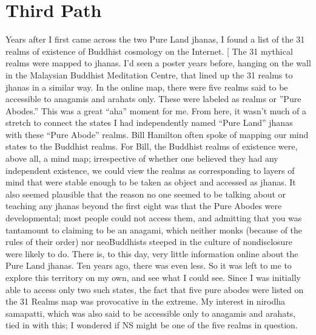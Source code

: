 \documentclass[a5paper,10pt,english]{book}
\begin{document}
\section{Third Path}
\label{\detokenize{main-1:third-path}}
\sphinxAtStartPar
Years after I first came across the two Pure Land jhanas, I found a list
of the 31 realms of existence of Buddhist cosmology on the Internet.
{[}\sphinxurl{http://www.accesstoinsight.org/ptf/dhamma/sagga/loka.html}{]} The 31
mythical realms were mapped to jhanas. I’d seen a poster years before,
hanging on the wall in the Malaysian Buddhist Meditation Centre, that
lined up the 31 realms to jhanas in a similar way. In the online map,
there were five realms said to be accessible to anagamis and arahats
only. These were labeled as  realms or ”Pure Abodes.” This
was a great “aha” moment for me. From here, it wasn’t much of a stretch
to connect the states I had independently named “Pure Land” jhanas with
these “Pure Abode” realms. Bill Hamilton often spoke of mapping our mind
states to the Buddhist realms. For Bill, the Buddhist realms of
existence were, above all, a mind map; irrespective of whether one
believed they had any independent existence, we could view the realms as
corresponding to layers of mind that were stable enough to be taken as
object and accessed as jhanas. It also seemed plausible that the reason
no one seemed to be talking about or teaching any jhanas beyond the
first eight was that the Pure Abodes were developmental; most people
could not access them, and admitting that you  was tantamount to
claiming to be an anagami, which neither monks (because of the rules of
their order) nor neo\sphinxhyphen{}Buddhists steeped in the culture of non\sphinxhyphen{}disclosure
were likely to do. There is, to this day, very little information online
about the Pure Land jhanas. Ten years ago, there was even less. So it
was left to me to explore this territory on my own, and see what I could
see. Since I was initially able to access only two such states, the fact
that five pure abodes were listed on the 31 Realms map was provocative
in the extreme. My interest in nirodha samapatti, which was also said to
be accessible only to anagamis and arahats, tied in with this; I
wondered if NS might be one of the five realms in question.
\end{document}
